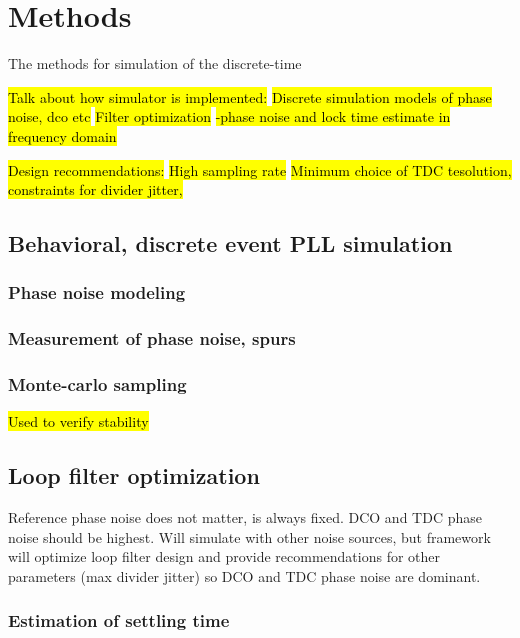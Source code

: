\section{Methods}\label{methods}
The methods for simulation of the discrete-time 

\hl{Talk about how simulator is implemented:}
\hl{Discrete simulation models of phase noise, dco etc}
\hl{Filter optimization}
\hl{-phase noise and lock time estimate in frequency domain}

\hl{Design recommendations:}
\hl{High sampling rate}
\hl{Minimum choice of TDC tesolution, constraints for divider jitter,}
\subsection{Behavioral, discrete event PLL simulation}
\subsubsection{Phase noise modeling}
\subsubsection{Measurement of phase noise, spurs}
\subsubsection{Monte-carlo sampling}
	\hl{Used to verify stability}

\subsection{Loop filter optimization}
	Reference phase noise does not matter, is always fixed.
	DCO and TDC phase noise should be highest. Will simulate with other noise sources, but framework will optimize loop filter design and provide recommendations for other parameters (max divider jitter) so DCO and TDC phase noise are dominant.
\subsubsection{Estimation of settling time}

